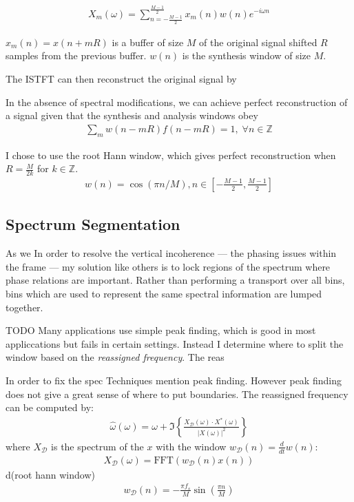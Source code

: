 \documentclass[12pt]{article}
\newcommand{\fft}{\text{FFT}}
\begin{document}
\begin{align}
  X_m(\omega) = 
  \sum_{n = -\frac{M-1}{2}}^{\frac{M - 1}{2}} 
  x_m(n)w(n)e^{-i\omega n}
\end{align}

$x_m(n) = x(n + mR)$ 
is a buffer of size $M$ of the original signal
shifted $R$ samples from the previous buffer.
$w(n)$ is the synthesis window of size $M$.

The ISTFT can then reconstruct the
original signal by


In the absence of spectral modifications, 
we can achieve perfect reconstruction 
of a signal given that the synthesis and analysis windows obey
\begin{align}
  \sum_m w(n - mR)f(n - mR) = 1,\; \forall n\in \mathbb{Z}
\end{align}

I chose to use the root Hann window, which gives perfect reconstruction when $R = \frac{M}{2k}$ for $k\in\mathbb{Z}$.
\begin{align*}
  w(n) = 
  \cos(\pi n / M), 
  n\in
  \left[
  -\frac{M-1}{2}, 
  \frac{M-1}{2}
\right]
\end{align*}

\subsection{Spectrum Segmentation}

As we 
In order to resolve the vertical incoherence --- the phasing issues within the frame --- my solution like others is to lock regions of the spectrum where phase relations are important. Rather than performing a transport over all bins, bins which are used to represent the same spectral information are lumped together. 

TODO
Many applications use simple peak finding, which is good in most appliccations but fails in certain settings.
Instead I determine where to split the window based on the \emph{reassigned frequency}.
The reas


In order to fix the spec
Techniques mention peak finding.
However peak finding does not give a great sense of where to put boundaries. 
The reassigned frequency can be computed by:
\begin{align}
  \hat{\omega}(\omega) = 
  \omega + 
  \Im\left\{%
    \frac{X_\mathcal{D}(\omega)\cdot X^*(\omega)}{|X(\omega)|^2}
  \right\}
\end{align}
where $X_\mathcal{D}$ is the spectrum of the $x$ with the window
$w_\mathcal{D}(n) = \frac{d}{dt}w(n)$:
\begin{align}
  X_\mathcal{D}(\omega) = \fft\left(w_\mathcal{D}(n)x(n)\right)
\end{align}
d(root hann window)
\begin{align*}
   w_\mathcal{D}(n) = -\frac{\pi f_s}{M}\sin\left(\frac{\pi n}{M}\right)
\end{align*}
\end{document}
